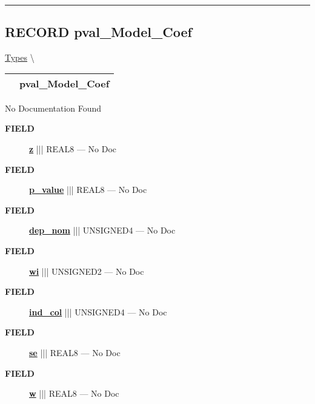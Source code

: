 \rule{\linewidth}{0.5pt}
\subsection*{\textsf{\colorbox{headtoc}{\color{white} RECORD}
pval\_Model\_Coef}}

\hypertarget{ecldoc:logisticregression.types.pval_model_coef}{}
\hspace{0pt} \hyperlink{ecldoc:LogisticRegression.Types}{Types} \textbackslash 

{\renewcommand{\arraystretch}{1.5}
\begin{tabularx}{\textwidth}{|>{\raggedright\arraybackslash}l|X|}
\hline
\hspace{0pt}\mytexttt{\color{red} } & \textbf{pval\_Model\_Coef} \\
\hline
\end{tabularx}
}

\par





No Documentation Found







\par
\begin{description}
\item [\colorbox{tagtype}{\color{white} \textbf{\textsf{FIELD}}}] \textbf{\underline{z}} ||| REAL8 --- No Doc
\item [\colorbox{tagtype}{\color{white} \textbf{\textsf{FIELD}}}] \textbf{\underline{p\_value}} ||| REAL8 --- No Doc
\item [\colorbox{tagtype}{\color{white} \textbf{\textsf{FIELD}}}] \textbf{\underline{dep\_nom}} ||| UNSIGNED4 --- No Doc
\item [\colorbox{tagtype}{\color{white} \textbf{\textsf{FIELD}}}] \textbf{\underline{wi}} ||| UNSIGNED2 --- No Doc
\item [\colorbox{tagtype}{\color{white} \textbf{\textsf{FIELD}}}] \textbf{\underline{ind\_col}} ||| UNSIGNED4 --- No Doc
\item [\colorbox{tagtype}{\color{white} \textbf{\textsf{FIELD}}}] \textbf{\underline{se}} ||| REAL8 --- No Doc
\item [\colorbox{tagtype}{\color{white} \textbf{\textsf{FIELD}}}] \textbf{\underline{w}} ||| REAL8 --- No Doc
\end{description}





